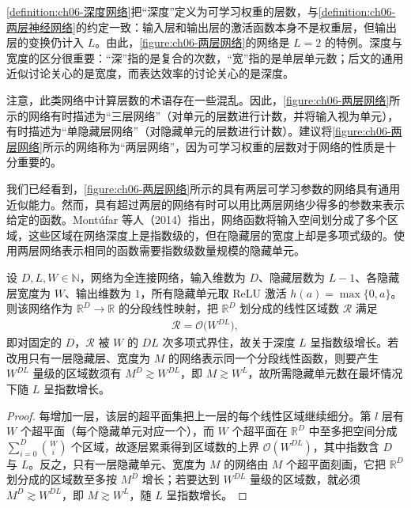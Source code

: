 \documentclass[../../main.tex]{subfiles}
\begin{document}
\begin{remark}\cref{definition:ch06-深度网络}把“深度”定义为可学习权重的层数，与\cref{definition:ch06-两层神经网络}的约定一致：输入层和输出层的激活函数本身不是权重层，但输出层的变换仍计入 $L$。由此，\cref{figure:ch06-两层网络}的网络是 $L=2$ 的特例。深度与宽度的区分很重要：“深”指的是复合的次数，“宽”指的是单层单元数；后文的通用近似讨论关心的是宽度，而表达效率的讨论关心的是深度。
\end{remark}

注意，此类网络中计算层数的术语存在一些混乱。因此，\cref{figure:ch06-两层网络}所示的网络有时描述为“三层网络”（对单元的层数进行计数，并将输入视为单元），有时描述为“单隐藏层网络”（对隐藏单元的层数进行计数）。建议将\cref{figure:ch06-两层网络}所示的网络称为“两层网络”，因为可学习权重的层数对于网络的性质是十分重要的。

我们已经看到，\cref{figure:ch06-两层网络}所示的具有两层可学习参数的网络具有通用近似能力。然而，具有超过两层的网络有时可以用比两层网络少得多的参数来表示给定的函数。Montúfar 等人（2014）指出，网络函数将输入空间划分成了多个区域，这些区域在网络深度上是指数级的，但在隐藏层的宽度上却是多项式级的。使用两层网络表示相同的函数需要指数级数量规模的隐藏单元。

\begin{proposition}[分段线性区域数随深度指数增长]\label{proposition:ch06-区域数量}
设 $D,L,W\in\mathbb{N}$，网络为全连接网络，输入维数为 $D$、隐藏层数为 $L-1$、各隐藏层宽度为 $W$、输出维数为 $1$，所有隐藏单元取 ReLU 激活 $h(a)=\max\{0,a\}$。则该网络作为 $\mathbb{R}^{D}\to\mathbb{R}$ 的分段线性映射，把 $\mathbb{R}^{D}$ 划分成的线性区域数 $\mathcal{R}$ 满足
\begin{align}
\mathcal{R}=\mathcal{O}\bigl(W^{DL}\bigr),
\label{align:ch06-区域数深度}
\end{align}
即对固定的 $D$，$\mathcal{R}$ 被 $W$ 的 $DL$ 次多项式界住，故关于深度 $L$ 呈指数级增长。若改用只有一层隐藏层、宽度为 $M$ 的网络表示同一个分段线性函数，则要产生 $W^{DL}$ 量级的区域数须有 $M^{D}\gtrsim W^{DL}$，即 $M\gtrsim W^{L}$，故所需隐藏单元数在最坏情况下随 $L$ 呈指数增长。
\end{proposition}

\begin{proof}
每增加一层，该层的超平面集把上一层的每个线性区域继续细分。第 $l$ 层有 $W$ 个超平面（每个隐藏单元对应一个），而 $W$ 个超平面在 $\mathbb{R}^{D}$ 中至多把空间分成 $\sum_{i=0}^{D}\binom{W}{i}$ 个区域，故逐层累乘得到区域数的上界 $\mathcal{O}(W^{DL})$，其中指数含 $D$ 与 $L$。反之，只有一层隐藏单元、宽度为 $M$ 的网络由 $M$ 个超平面刻画，它把 $\mathbb{R}^{D}$ 划分成的区域数至多按 $M^{D}$ 增长；若要达到 $W^{DL}$ 量级的区域数，就必须 $M^{D}\gtrsim W^{DL}$，即 $M\gtrsim W^{L}$，随 $L$ 呈指数增长。
\end{proof}
\end{document}
